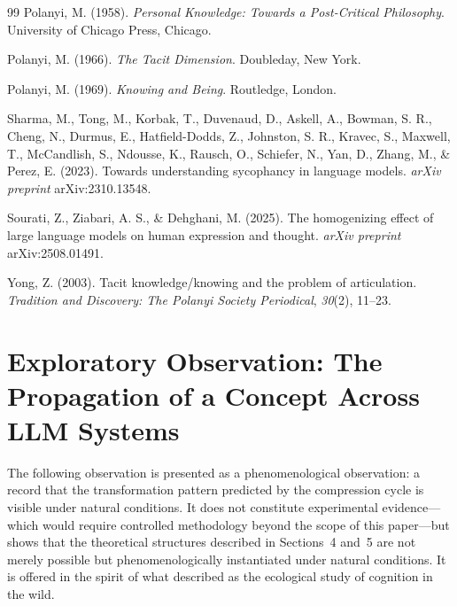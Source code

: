 \documentclass[12pt]{article}
\begin{document}
\begin{thebibliography}{99}
Polanyi, M. (1958). \textit{Personal Knowledge: Towards a Post-Critical Philosophy}. University of Chicago Press, Chicago.

Polanyi, M. (1966). \textit{The Tacit Dimension}. Doubleday, New York.

Polanyi, M. (1969). \textit{Knowing and Being}. Routledge, London.

Sharma, M., Tong, M., Korbak, T., Duvenaud, D., Askell, A., Bowman, S. R., Cheng, N., Durmus, E., Hatfield-Dodds, Z., Johnston, S. R., Kravec, S., Maxwell, T., McCandlish, S., Ndousse, K., Rausch, O., Schiefer, N., Yan, D., Zhang, M., \& Perez, E. (2023). Towards understanding sycophancy in language models. \textit{arXiv preprint} arXiv:2310.13548.

Sourati, Z., Ziabari, A. S., \& Dehghani, M. (2025). The homogenizing effect of large language models on human expression and thought. \textit{arXiv preprint} arXiv:2508.01491.

Yong, Z. (2003). Tacit knowledge/knowing and the problem of articulation. \textit{Tradition and Discovery: The Polanyi Society Periodical}, \textit{30}(2), 11--23.

\end{thebibliography}

\appendix

\section{Exploratory Observation: The Propagation of a Concept Across LLM Systems}

The following observation is presented as a phenomenological observation: a record that the transformation pattern predicted by the compression cycle is visible under natural conditions. It does not constitute experimental evidence---which would require controlled methodology beyond the scope of this paper---but shows that the theoretical structures described in Sections~4 and~5 are not merely possible but phenomenologically instantiated under natural conditions. It is offered in the spirit of what \citet{hutchins1995} described as the ecological study of cognition in the wild.
\end{document}
